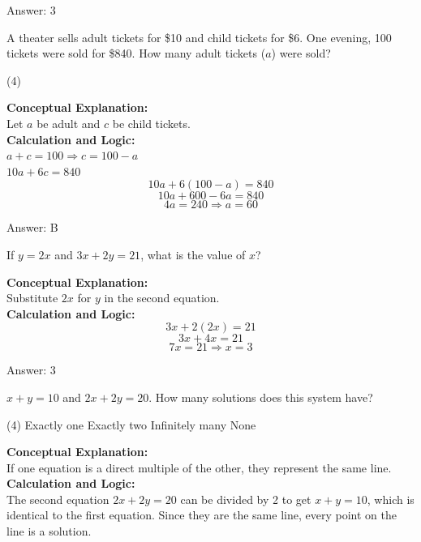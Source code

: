 \documentclass[11pt,paper=a4,answers]{exam}
\begin{document}
\begin{questions}
\begin{solution}
\vspace{15pt}
Answer: \colorbox{yellow!100}{3}
\end{solution}

\question
A theater sells adult tickets for \$10 and child tickets for \$6. One evening, 100 tickets were sold for \$840. How many adult tickets ($a$) were sold?
\begin{tasks}(4)
\end{tasks}

\begin{solution}
\textbf{Conceptual Explanation:} \\
Let $a$ be adult and $c$ be child tickets.
\\[10pt]
\textbf{Calculation and Logic:} \\
$a + c = 100 \Rightarrow c = 100 - a$ \\
$10a + 6c = 840$ \\
\[10a + 6(100 - a) = 840\]
\[10a + 600 - 6a = 840\]
\[4a = 240 \Rightarrow a = 60\]

\vspace{15pt}
Answer: \colorbox{yellow!100}{B}
\end{solution}

\question
If $y = 2x$ and $3x + 2y = 21$, what is the value of $x$?

\begin{solution}
\textbf{Conceptual Explanation:} \\
Substitute $2x$ for $y$ in the second equation.
\\[10pt]
\textbf{Calculation and Logic:} \\
\[3x + 2(2x) = 21\]
\[3x + 4x = 21\]
\[7x = 21 \Rightarrow x = 3\]

\vspace{15pt}
Answer: \colorbox{yellow!100}{3}
\end{solution}

\question
$x + y = 10$ and $2x + 2y = 20$. How many solutions does this system have?
\begin{tasks}(4)
    \task Exactly one
    \task Exactly two
    \task Infinitely many
    \task None
\end{tasks}

\begin{solution}
\textbf{Conceptual Explanation:} \\
If one equation is a direct multiple of the other, they represent the same line.
\\[10pt]
\textbf{Calculation and Logic:} \\
The second equation $2x + 2y = 20$ can be divided by 2 to get $x + y = 10$, which is identical to the first equation. Since they are the same line, every point on the line is a solution.


\end{solution}
\end{questions}
\end{document}

